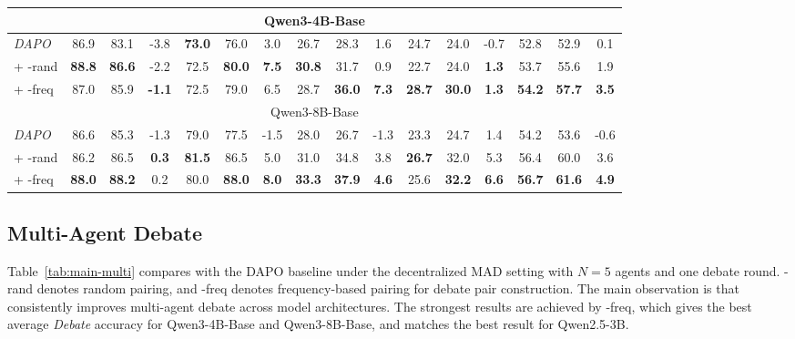 \begin{table}[t]
\begin{center}
{\begin{tabular}{lccccccccccccccc}
        \midrule
        \multicolumn{16}{c}{Qwen3-4B-Base} \\
        \midrule
        \emph{DAPO}               & 86.9 & 83.1 & -3.8 & \textbf{73.0} & 76.0 & 3.0 & 26.7 & 28.3 & 1.6 & 24.7 & 24.0 & -0.7 & 52.8 & 52.9 & 0.1 \\
        + \SDRL{}-rand        & \textbf{88.8} & \textbf{86.6} & -2.2 & 72.5 & \textbf{80.0} & \textbf{7.5} & \textbf{30.8} & 31.7 & 0.9 & 22.7 & 24.0 & \textbf{1.3} & 53.7 & 55.6 & 1.9 \\
        + \SDRL{}-freq         & 87.0 & 85.9 & \textbf{-1.1} & 72.5 & 79.0 & 6.5 & 28.7 & \textbf{36.0} & \textbf{7.3} & \textbf{28.7} & \textbf{30.0} & \textbf{1.3} & \textbf{54.2} & \textbf{57.7} & \textbf{3.5} \\
        \midrule
        \multicolumn{16}{c}{Qwen3-8B-Base} \\
        \midrule
        \emph{DAPO}               & 86.6 & 85.3 & -1.3 & 79.0 & 77.5 & -1.5 & 28.0 & 26.7 & -1.3 & 23.3 & 24.7 & 1.4 & 54.2 & 53.6 & -0.6 \\
        + \SDRL{}-rand     & 86.2 & 86.5 & \textbf{0.3} & \textbf{81.5} & 86.5 & 5.0 & 31.0 & 34.8 & 3.8 & \textbf{26.7} & 32.0 & 5.3 & 56.4 & 60.0 & 3.6 \\
        + \SDRL{}-freq     & \textbf{88.0} & \textbf{88.2} & 0.2 & 80.0 & \textbf{88.0} & \textbf{8.0} & \textbf{33.3} & \textbf{37.9} & \textbf{4.6} & 25.6 & \textbf{32.2} & \textbf{6.6} & \textbf{56.7} & \textbf{61.6} & \textbf{4.9} \\
        \bottomrule
      \end{tabular}
    }
  \end{center}
  \vskip -0.1in
\end{table}


\subsection{Multi-Agent Debate}
\label{debate_exp}
Table~\ref{tab:main-multi} compares \SDRL{} with the DAPO baseline under the decentralized MAD setting with $N{=}5$ agents and one debate round. \SDRL{}-rand denotes random pairing, and \SDRL{}-freq denotes frequency-based pairing for debate pair construction. The main observation is that \SDRL{} consistently improves multi-agent debate across model architectures. The strongest results are achieved by \SDRL{}-freq, which gives the best average \textit{Debate} accuracy for Qwen3-4B-Base and Qwen3-8B-Base, and matches the best result for Qwen2.5-3B.

